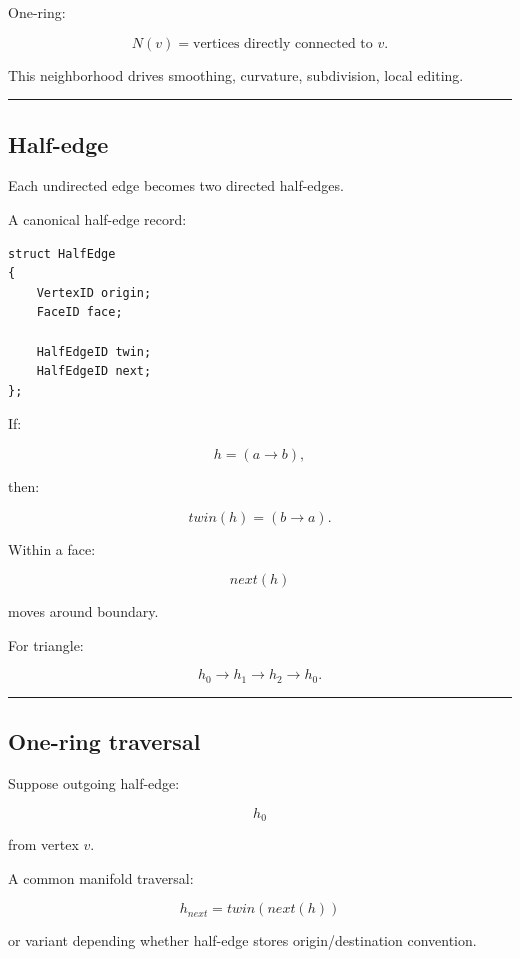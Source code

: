 One-ring:

\[
\boxed{
N(v)
=
\text{vertices directly connected to }v.
}
\]

This neighborhood drives smoothing, curvature, subdivision, local editing.

\begin{center}\rule{0.5\linewidth}{0.5pt}\end{center}

\subsection{Half-edge}\label{04-visual-computing-ii-ch041-half-edge}

Each undirected edge becomes two directed half-edges.

A canonical half-edge record:

\begin{verbatim}
struct HalfEdge
{
    VertexID origin;
    FaceID face;

    HalfEdgeID twin;
    HalfEdgeID next;
};
\end{verbatim}

If:

\[
h=(a\rightarrow b),
\]

then:

\[
twin(h)
=
(b\rightarrow a).
\]

Within a face:

\[
next(h)
\]

moves around boundary.

For triangle:

\[
h_0\rightarrow h_1\rightarrow h_2\rightarrow h_0.
\]

\begin{center}\rule{0.5\linewidth}{0.5pt}\end{center}

\subsection{One-ring traversal}\label{04-visual-computing-ii-ch041-one-ring-traversal}

Suppose outgoing half-edge:

\[
h_0
\]

from vertex \(v\).

A common manifold traversal:

\[
\boxed{
h_{next}
=
twin(next(h))
}
\]

or variant depending whether half-edge stores origin/destination convention.

